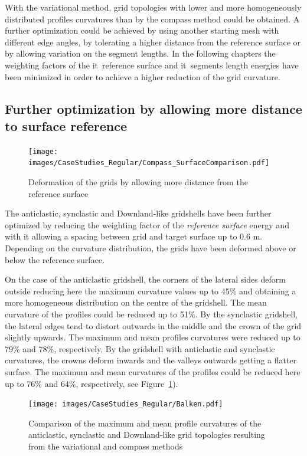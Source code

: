 \documentclass[Thesis.tex]{subfiles}
\begin{document}
With the variational method, grid topologies with lower and more homogeneously distributed profiles curvatures than by the compass method could be obtained. A further optimization could be achieved by using another starting mesh with different edge angles, by tolerating a higher distance from the reference surface or by allowing variation on the segment lengths. In the following chapters the weighting factors of the {it\ reference surface} and {it\ segments length} energies have been minimized in order to achieve a higher reduction of the grid curvature.

\subsection{Further optimization by allowing more distance to surface reference}

\begin{figure}
\centering
\texttt{[image: images/CaseStudies\_Regular/Compass\_SurfaceComparison.pdf]}
\caption{Deformation of the grids by allowing more distance from the reference surface}
\label{fig:Compass_SurfaceComparison}
\end{figure}

The anticlastic, synclastic and Downland-like gridshells have been further optimized by reducing the weighting factor of the {\it reference surface} energy and with it allowing a spacing between grid and target surface up to 0.6 m. Depending on the curvature distribution, the grids have been deformed above or below the reference surface.

On the case of the anticlastic gridshell, the corners of the lateral sides deform outside reducing here the maximum curvature values up to 45\% and obtaining a more homogeneous distribution on the centre of the gridshell. The mean curvature of the profiles could be reduced up to 51\%. By the synclastic gridshell, the lateral edges tend to distort outwards in the middle and the crown of the grid slightly upwards. The maximum and mean profiles curvatures were reduced up to 79\% and 78\%, respectively. By the gridshell with anticlastic and synclastic curvatures, the crowns deform inwards and the valleys outwards getting a flatter surface. The maximum and mean curvatures of the profiles could be reduced here up to 76\% and 64\%, respectively, see Figure~\ref{fig:Compass_SurfaceComparison}).

\begin{figure}
\centering
\texttt{[image: images/CaseStudies\_Regular/Balken.pdf]}
\caption{Comparison of the maximum and mean profile curvatures of the anticlastic, synclastic and Downland-like grid topologies resulting from the variational and compass methods}
\label{fig:Balken}
\end{figure}
\end{document}
